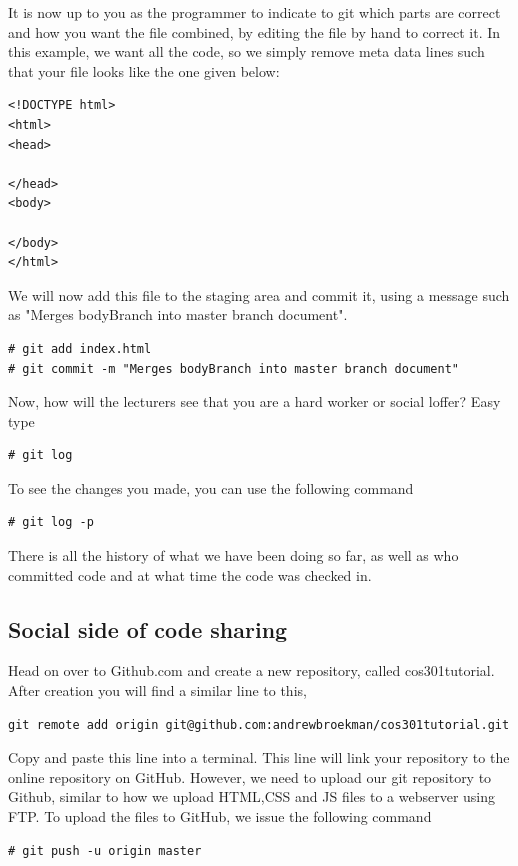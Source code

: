 \documentclass[a4paper,10pt]{article}
\begin{document}
It is now up to you as the programmer to indicate to git which parts are correct and how you want the file combined, by editing the file by hand to correct it. In this example, we want all the code, so we simply remove meta data lines such that your file looks like the one given below:
\begin{lstlisting}[style=HtmlStyle]
<!DOCTYPE html>
<html>
<head>

</head>
<body>

</body>
</html>
\end{lstlisting}

We will now add this file to the staging area and commit it, using a message such as "Merges bodyBranch into master branch document".
\begin{lstlisting}[style=TerminalStyle]
# git add index.html
# git commit -m "Merges bodyBranch into master branch document"
\end{lstlisting}

Now, how will the lecturers see that you are a hard worker or social loffer? Easy type 

\begin{lstlisting}[style=TerminalStyle]
# git log
\end{lstlisting}

To see the changes you made, you can use the following command
\begin{lstlisting}[style=TerminalStyle]
# git log -p
\end{lstlisting}

There is all the history of what we have been doing so far, as well as who committed code and at what time the code was checked in.

\subsection{Social side of code sharing}
Head on over to Github.com and create a new repository, called cos301tutorial. After creation you will find a similar line to this,

\begin{lstlisting}[style=OutputStyle]
git remote add origin git@github.com:andrewbroekman/cos301tutorial.git
\end{lstlisting}

Copy and paste this line into a terminal. This line will link your repository to the online repository on GitHub. However, we need to upload our git repository to Github, similar to how we upload HTML,CSS and JS files to a webserver using FTP. To upload the files to GitHub, we issue the following command
\begin{lstlisting}[style=TerminalStyle]
# git push -u origin master
\end{lstlisting}
\end{document}
